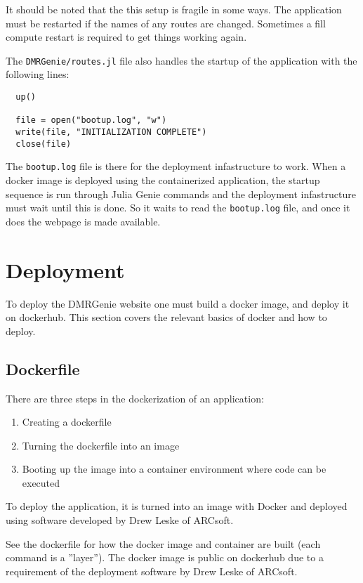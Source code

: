 \documentclass{article}
\begin{document}
\begin{multicols}{2}
It should be noted that the this setup is fragile in some ways. The application must be restarted if the names of any routes are changed. Sometimes a fill compute restart is required to get things working again.

The \lstinline|DMRGenie/routes.jl| file also handles the startup of the application with the following lines:

\begin{verbatim}
  up()

  file = open("bootup.log", "w")
  write(file, "INITIALIZATION COMPLETE")
  close(file)
\end{verbatim}

The \lstinline|bootup.log| file is there for the deployment infastructure to work. When a docker image is deployed using the containerized application, the startup sequence is run through Julia Genie commands and the deployment infastructure must wait until this is done. So it waits to read the \lstinline|bootup.log| file, and once it does the webpage is made available.


\section{Deployment}

To deploy the DMRGenie website one must build a docker image, and deploy it on dockerhub. This section covers the relevant basics of docker and how to deploy.

\subsection{Dockerfile}

There are three steps in the dockerization of an application:

\begin{enumerate}
  \item Creating a dockerfile
  \item Turning the dockerfile into an image
  \item Booting up the image into a container environment where code can be executed
\end{enumerate}

To deploy the application, it is turned into an image with Docker and deployed using software developed by Drew Leske of ARCsoft.

See the dockerfile for how the docker image and container are built (each command is a ''layer''). The docker image is public on dockerhub due to a requirement of the deployment software by Drew Leske of ARCsoft.


\end{multicols}
\end{document}

